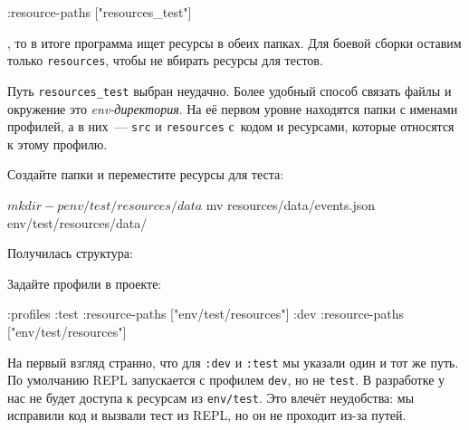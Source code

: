\begin{english}
  \begin{clojure}
:resource-paths ["resources_test"]
  \end{clojure}
\end{english}

\noindent
, то в итоге программа ищет ресурсы в обеих папках. Для боевой сборки оставим
только \verb|resources|, чтобы не вбирать ресурсы для тестов.


Путь \verb|resources_test| выбран неудачно. Более удобный способ связать файлы
и окружение это \emph{env-директория}. На её первом уровне находятся папки с
именами профилей, а в них~--- \verb|src| и \verb|resources| с~кодом и
ресурсами, которые относятся к этому профилю.

Создайте папки и переместите ресурсы для теста:

\begin{english}
  \begin{bash}
$ mkdir -p env/test/resources/data
$ mv resources/data/events.json env/test/resources/data/
  \end{bash}
\end{english}

\noindent
Получилась структура:

\begin{english}
\end{english}


\linegap

\noindent
Задайте профили в проекте:

\begin{english}
  \begin{clojure}
:profiles {:test {:resource-paths ["env/test/resources"]}
           :dev  {:resource-paths ["env/test/resources"]}}
  \end{clojure}
\end{english}

На первый взгляд странно, что для \verb|:dev| и \verb|:test| мы указали один
и тот же путь. По умолчанию REPL запускается с профилем \verb|dev|, но не
\verb|test|. В разработке у нас не будет доступа к ресурсам из
\verb|env/test|. Это влечёт неудобства: мы исправили код и вызвали тест из
REPL, но он не проходит из-за путей.

